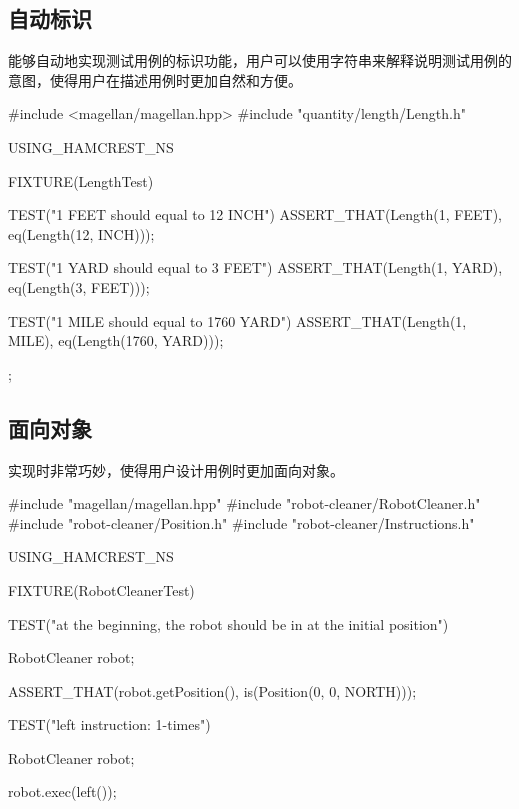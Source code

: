 \begin{content}

\subsection{自动标识}

能够自动地实现测试用例的标识功能，用户可以使用字符串来解释说明测试用例的意图，使得用户在描述用例时更加自然和方便。

\begin{leftbar}
\begin{c++}[caption={test/quantity/LengthTest.cpp}]
#include <magellan/magellan.hpp>
#include "quantity/length/Length.h"

USING_HAMCREST_NS

FIXTURE(LengthTest)
{
    TEST("1 FEET should equal to 12 INCH")
    {
        ASSERT_THAT(Length(1, FEET), eq(Length(12, INCH)));
    }

    TEST("1 YARD should equal to 3 FEET")
    {
        ASSERT_THAT(Length(1, YARD), eq(Length(3, FEET)));
    }

    TEST("1 MILE should equal to 1760 YARD")
    {
        ASSERT_THAT(Length(1, MILE), eq(Length(1760, YARD)));
    }
};
\end{c++}
\end{leftbar}

\subsection{面向对象}

实现时非常巧妙，使得用户设计用例时更加面向对象。

\begin{leftbar}
\begin{c++}[caption={test/robot-cleaner/RobotCleanerTest.cpp}]
#include "magellan/magellan.hpp"
#include "robot-cleaner/RobotCleaner.h"
#include "robot-cleaner/Position.h"
#include "robot-cleaner/Instructions.h"

USING_HAMCREST_NS

FIXTURE(RobotCleanerTest)
{
    TEST("at the beginning, the robot should be in at the initial position")
    {
        RobotCleaner robot;

        ASSERT_THAT(robot.getPosition(), is(Position(0, 0, NORTH)));
    }

    TEST("left instruction: 1-times")
    {
        RobotCleaner robot;

        robot.exec(left());
        
}}
\end{c++}
\end{leftbar}
\end{content}
